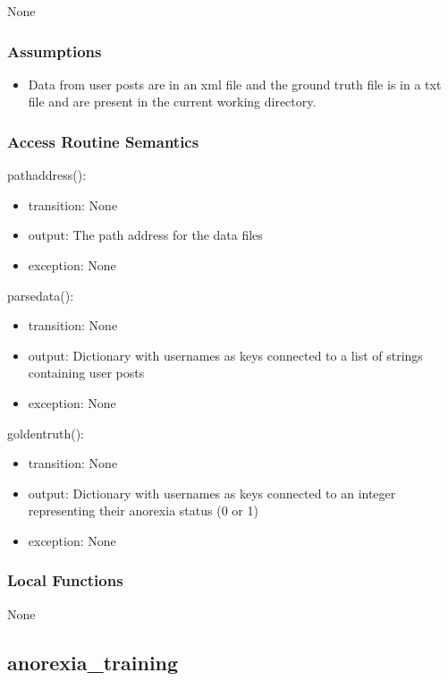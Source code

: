 \documentclass[12pt, titlepage]{article}
\begin{document}
None

\subsubsection{Assumptions}

\begin{itemize}
\item Data from user posts are in an xml file and the ground truth file is in a txt file and are present in the current working directory.
\end{itemize}

\subsubsection{Access Routine Semantics}

\noindent pathaddress():
\begin{itemize}
\item transition: None
\item output: The path address for the data files
\item exception: None
\end{itemize}

\noindent parsedata():
\begin{itemize}
\item transition: None
\item output: Dictionary with usernames as keys connected to a list of strings containing user posts
\item exception: None
\end{itemize}

\noindent goldentruth():
\begin{itemize}
\item transition: None
\item output: Dictionary with usernames as keys connected to an integer representing their anorexia status (0 or 1)
\item exception: None
\end{itemize}

\subsubsection{Local Functions}

None

\subsection{anorexia\_training}
\end{document}
